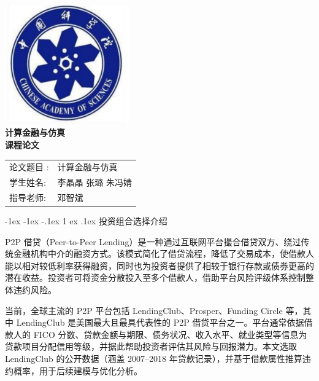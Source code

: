 \documentclass{write_paper}
\makeatletter
\renewcommand\section{\@startsection {section}{1}{\z@}%
                                   {-1ex \@plus -1ex \@minus -.1ex}%
                                   {1 ex \@plus.1ex}%
                                   {\normalfont\large\bfseries}}
\makeatother
\begin{document}
\vspace*{\fill}

\begin{center}

    \includegraphics[width=0.4\textwidth]{Figures/校徽.png}\\[1cm]
       \Huge \bfseries
      {计算金融与仿真}\\[0.5cm]
       \Huge \bfseries
      {课程论文}\\[2cm]
    
    \Large
    \begin{table}[htbp]
    \centering
    \Large
    \begin{tabular}{ll}
   {论文题目 }: & 计算金融与仿真 \\
   {学生姓名}: & 李晶晶 \quad 张璐 \quad 朱冯婧 \\
   {指导老师}: & 邓智斌 
    \end{tabular}
    \end{table}

    


\end{center}

\vspace*{\fill}
\newpage
 



\section{投资组合选择介绍}

P2P 借贷（Peer-to-Peer Lending）是一种通过互联网平台撮合借贷双方、绕过传统金融机构中介的融资方式。该模式简化了借贷流程，降低了交易成本，使借款人能以相对较低利率获得融资，同时也为投资者提供了相较于银行存款或债券更高的潜在收益。投资者可将资金分散投入至多个借款人，借助平台风险评级体系控制整体违约风险。

当前，全球主流的 P2P 平台包括 LendingClub、Prosper、Funding Circle 等，其中 LendingClub 是美国最大且最具代表性的 P2P 借贷平台之一。平台通常依据借款人的 FICO 分数、贷款金额与期限、债务状况、收入水平、就业类型等信息为贷款项目分配信用等级，并据此帮助投资者评估其风险与回报潜力。本文选取 LendingClub 的公开数据（涵盖 2007--2018 年贷款记录），并基于借款属性推算违约概率，用于后续建模与优化分析。
\end{document}
